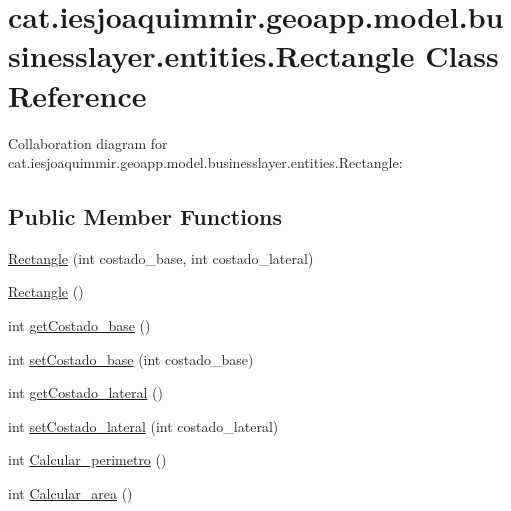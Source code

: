 \hypertarget{classcat_1_1iesjoaquimmir_1_1geoapp_1_1model_1_1businesslayer_1_1entities_1_1_rectangle}{}\section{cat.\+iesjoaquimmir.\+geoapp.\+model.\+businesslayer.\+entities.\+Rectangle Class Reference}
\label{classcat_1_1iesjoaquimmir_1_1geoapp_1_1model_1_1businesslayer_1_1entities_1_1_rectangle}


Collaboration diagram for cat.\+iesjoaquimmir.\+geoapp.\+model.\+businesslayer.\+entities.\+Rectangle\+:
\subsection*{Public Member Functions}
\begin{DoxyCompactItemize}
\item 
\mbox{\hyperlink{classcat_1_1iesjoaquimmir_1_1geoapp_1_1model_1_1businesslayer_1_1entities_1_1_rectangle_ad88ae932c53746f3527f6b62adcc9925}{Rectangle}} (int costado\+\_\+base, int costado\+\_\+lateral)
\item 
\mbox{\hyperlink{classcat_1_1iesjoaquimmir_1_1geoapp_1_1model_1_1businesslayer_1_1entities_1_1_rectangle_a9c4932a721f48718701b3d55e209c984}{Rectangle}} ()
\item 
int \mbox{\hyperlink{classcat_1_1iesjoaquimmir_1_1geoapp_1_1model_1_1businesslayer_1_1entities_1_1_rectangle_a70e29230b05fd1dea4db285cb3837cbb}{get\+Costado\+\_\+base}} ()
\item 
int \mbox{\hyperlink{classcat_1_1iesjoaquimmir_1_1geoapp_1_1model_1_1businesslayer_1_1entities_1_1_rectangle_a53eea7d0b06398ffb70f285e333546b5}{set\+Costado\+\_\+base}} (int costado\+\_\+base)
\item 
int \mbox{\hyperlink{classcat_1_1iesjoaquimmir_1_1geoapp_1_1model_1_1businesslayer_1_1entities_1_1_rectangle_abb390a7c2b33c1211564ef6786a48b91}{get\+Costado\+\_\+lateral}} ()
\item 
int \mbox{\hyperlink{classcat_1_1iesjoaquimmir_1_1geoapp_1_1model_1_1businesslayer_1_1entities_1_1_rectangle_a12bd9cfd59e0caaee3bddb11cfa13d5a}{set\+Costado\+\_\+lateral}} (int costado\+\_\+lateral)
\item 
int \mbox{\hyperlink{classcat_1_1iesjoaquimmir_1_1geoapp_1_1model_1_1businesslayer_1_1entities_1_1_rectangle_a380bab8bc9a256c45bba0cf473336e90}{Calcular\+\_\+perimetro}} ()
\item 
int \mbox{\hyperlink{classcat_1_1iesjoaquimmir_1_1geoapp_1_1model_1_1businesslayer_1_1entities_1_1_rectangle_adaa4f63f0b7f7df3af3bd03d4bd14876}{Calcular\+\_\+area}} ()
\end{DoxyCompactItemize}


